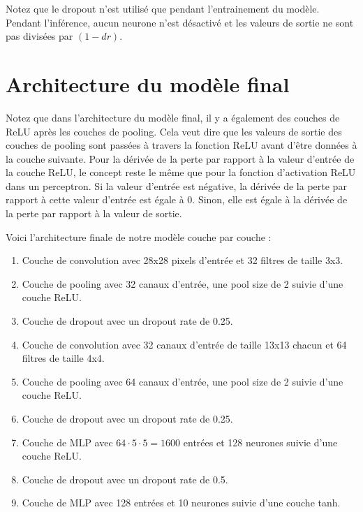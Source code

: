 \documentclass{article}
\begin{document}
\medskip

Notez que le dropout n'est utilisé que pendant l'entrainement du modèle. Pendant l'inférence, aucun neurone n'est désactivé et les valeurs de sortie ne sont pas divisées par $(1 - dr)$.

\section{Architecture du modèle final}

Notez que dans l'architecture du modèle final, il y a également des couches de ReLU après les couches de pooling. Cela veut dire que les valeurs de sortie des couches de pooling sont passées à travers la fonction ReLU avant d'être données à la couche suivante. Pour la dérivée de la perte par rapport à la valeur d'entrée de la couche ReLU, le concept reste le même que pour la fonction d'activation ReLU dans un perceptron. Si la valeur d'entrée est négative, la dérivée de la perte par rapport à cette valeur d'entrée est égale à 0. Sinon, elle est égale à la dérivée de la perte par rapport à la valeur de sortie.

\medskip

Voici l'architecture finale de notre modèle couche par couche :

\begin{enumerate}
\item Couche de convolution avec 28x28 pixels d'entrée et 32 filtres de taille 3x3.
\item Couche de pooling avec 32 canaux d'entrée, une pool size de 2 suivie d'une couche ReLU.
\item Couche de dropout avec un dropout rate de 0.25.

\item Couche de convolution avec 32 canaux d'entrée de taille 13x13 chacun et 64 filtres de taille 4x4.
\item Couche de pooling avec 64 canaux d'entrée, une pool size de 2 suivie d'une couche ReLU.
\item Couche de dropout avec un dropout rate de 0.25.

\item Couche de MLP avec $64 \cdot 5 \cdot 5 = 1600$ entrées et 128 neurones suivie d'une couche ReLU.
\item Couche de dropout avec un dropout rate de 0.5.

\item Couche de MLP avec 128 entrées et 10 neurones suivie d'une couche tanh.
\end{enumerate}
\end{document}
